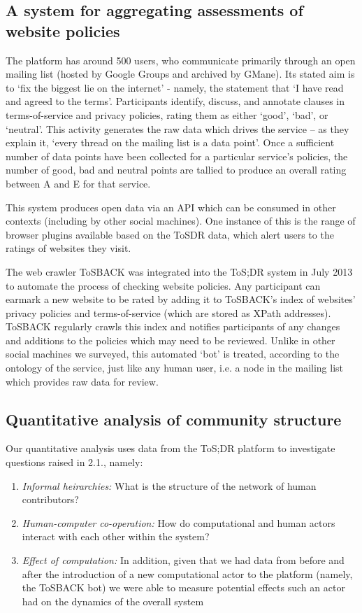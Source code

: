 \documentclass{sig-alternate}
\begin{document}
\subsection{A system for aggregating assessments of website policies}
The platform has around 500 users, who communicate primarily through an open mailing list (hosted by Google Groups and archived by GMane). Its stated aim is to `fix the biggest lie on the internet' - namely, the statement that `I have read and agreed to the terms'. Participants identify, discuss, and annotate clauses in terms-of-service and privacy policies, rating them as either `good', `bad', or `neutral'. This activity generates the raw data which drives the service – as they explain it, `every thread on the mailing list is a data point'. Once a sufficient number of data points have been collected for a particular service's policies, the number of good, bad and neutral points are tallied to produce an overall rating between A and E for that service.

This system produces open data via an API which can be consumed in other contexts (including by other social machines). One instance of this is the range of browser plugins available based on the ToSDR data, which alert users to the ratings of websites they visit.

The web crawler ToSBACK was integrated into the ToS;DR system in July 2013 to automate the process of checking website policies. Any participant can earmark a new website to be rated by adding it to ToSBACK's index of websites' privacy policies and terms-of-service (which are stored as XPath addresses). ToSBACK regularly crawls this index and notifies participants of any changes and additions to the policies which may need to be reviewed. Unlike in other social machines we surveyed, this automated `bot' is treated, according to the ontology of the service, just like any human user, i.e. a node in the mailing list which provides raw data for review.

\subsection{Quantitative analysis of community structure}

Our quantitative analysis uses data from the ToS;DR platform to investigate questions raised in 2.1., namely:
\begin{enumerate}
\item \emph{Informal heirarchies:} What is the structure of the network of human contributors?
\item \emph{Human-computer co-operation:} How do computational and human actors interact with each other within the system?
\item \emph{Effect of computation:} In addition, given that we had data from before and after the introduction of a new computational actor to the platform (namely, the ToSBACK bot) we were able to measure potential effects such an actor had on the dynamics of the overall system
\end{enumerate}
\end{document}
